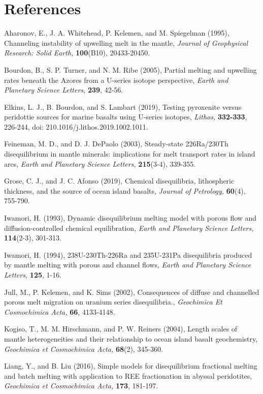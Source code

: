 \documentclass[draft]{agujournal2019}
\begin{document}
\section*{References}  %

Aharonov, E., J. A. Whitehead, P. Kelemen, and M. Spiegelman (1995),
Channeling instability of upwelling melt in the mantle, \emph{Journal of
Geophysical Research: Solid Earth,} \textbf{100}(B10), 20433-20450.

Bourdon, B., S. P. Turner, and N. M. Ribe (2005), Partial melting and
upwelling rates beneath the Azores from a U-series isotope perspective,
\emph{Earth and Planetary Science Letters,} \textbf{239}, 42-56.

Elkins, L. J., B. Bourdon, and S. Lambart (2019), Testing pyroxenite
versus peridottie sources for marine basalts using U-series isotopes,
\emph{Lithos,} \textbf{332-333}, 226-244, doi:
210.1016/j.lithos.2019.1002.1011.

Feineman, M. D., and D. J. DePaolo (2003), Steady-state 226Ra/230Th
disequilibrium in mantle minerals: implications for melt transport rates
in island arcs, \emph{Earth and Planetary Science Letters,}
\textbf{215}(3-4), 339-355.

Grose, C. J., and J. C. Afonso (2019), Chemical disequilibria,
lithospheric thickness, and the source of ocean island basalts,
\emph{Journal of Petrology,} \textbf{60}(4), 755-790.

Iwamori, H. (1993), Dynamic disequilibrium melting model with porous
flow and diffusion-controlled chemical equilibration, \emph{Earth and
Planetary Science Letters,} \textbf{114}(2-3), 301-313.

Iwamori, H. (1994), 238U-230Th-226Ra and 235U-231Pa disequilibria
produced by mantle melting with porous and channel flows, \emph{Earth
and Planetary Science Letters,} \textbf{125}, 1-16.

Jull, M., P. Kelemen, and K. Sims (2002), Consequences of diffuse and
channelled porous melt migration on uranium series disequilibria.,
\emph{Geochimica Et Cosmochimica Acta,} \textbf{66}, 4133-4148.

Kogiso, T., M. M. Hirschmann, and P. W. Reiners (2004), Length scales of
mantle heterogeneities and their relationship to ocean island basalt
geochemistry, \emph{Geochimica et Cosmochimica Acta,} \textbf{68}(2),
345-360.

Liang, Y., and B. Liu (2016), Simple models for disequilibrium
fractional melting and batch melting with application to REE
fractionation in abyssal peridotites, \emph{Geochimica et Cosmochimica
Acta,} \textbf{173}, 181-197.
\end{document}
